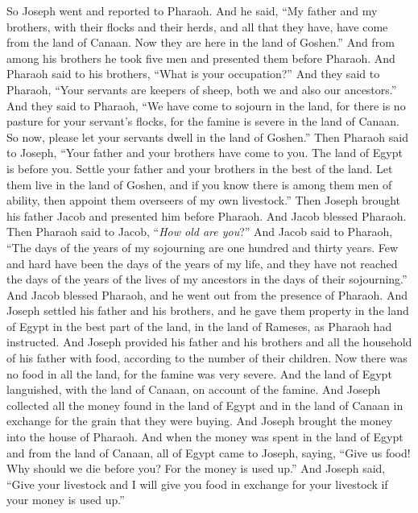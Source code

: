 \begin{biblechapter} %
 So Joseph went and reported to Pharaoh. And he said, “My father and my brothers, with their flocks and their herds, and all that they have, have come from the land of Canaan. Now they are here in the land of Goshen.”
\verse And from among his brothers he took five men and presented them before Pharaoh.
\verse And Pharaoh said to his brothers, “What is your occupation?” And they said to Pharaoh, “Your servants are keepers of sheep, both we and also our ancestors.”
\verse And they said to Pharaoh, “We have come to sojourn in the land, for there is no pasture for your servant’s flocks, for the famine is severe in the land of Canaan. So now, please let your servants dwell in the land of Goshen.”
\verse Then Pharaoh said to Joseph, “Your father and your brothers have come to you.
\verse The land of Egypt is before you. Settle your father and your brothers in the best of the land. Let them live in the land of Goshen, and if you know there is among them men of ability, then appoint them overseers of my own livestock.”
\verse Then Joseph brought his father Jacob and presented him before Pharaoh. And Jacob blessed Pharaoh.
\verse Then Pharaoh said to Jacob, “\textit{How old are you}?”
\verse And Jacob said to Pharaoh, “The days of the years of my sojourning are one hundred and thirty years. Few and hard have been the days of the years of my life, and they have not reached the days of the years of the lives of my ancestors in the days of their sojourning.”
\verse And Jacob blessed Pharaoh, and he went out from the presence of Pharaoh.
\verse And Joseph settled his father and his brothers, and he gave them property in the land of Egypt in the best part of the land, in the land of Rameses, as Pharaoh had instructed.
\verse And Joseph provided his father and his brothers and all the household of his father with food, according to the number of their children.
 Now there was no food in all the land, for the famine was very severe. And the land of Egypt languished, with the land of Canaan, on account of the famine.
\verse And Joseph collected all the money found in the land of Egypt and in the land of Canaan in exchange for the grain that they were buying. And Joseph brought the money into the house of Pharaoh.
\verse And when the money was spent in the land of Egypt and from the land of Canaan, all of Egypt came to Joseph, saying, “Give us food! Why should we die before you? For the money is used up.”
\verse And Joseph said, “Give your livestock and I will give you food in exchange for your livestock if your money is used up.”

\end{biblechapter}
